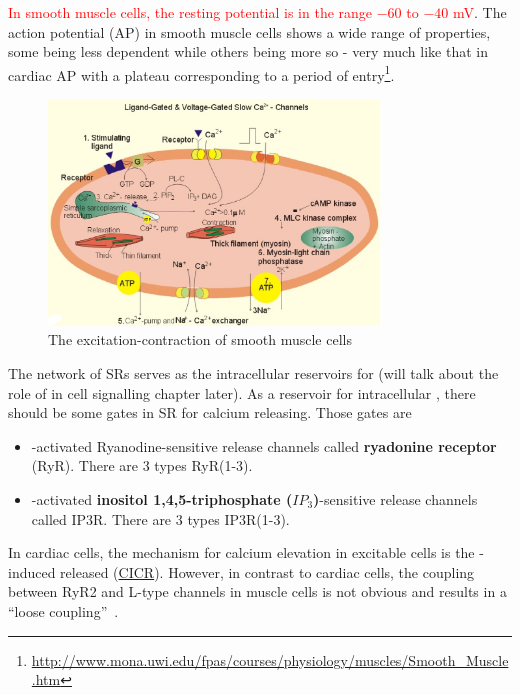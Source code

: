 \textcolor{red}{In smooth muscle cells, the resting potential is in
  the range $-60$ to $-40$ mV}.
The action potential (AP) in smooth muscle cells shows a wide range of
properties, some being less  dependent while others being
more so - very much like that in cardiac AP with a plateau
corresponding to a period of 
entry\footnote{\url{http://www.mona.uwi.edu/fpas/courses/physiology/muscles/Smooth_Muscle.htm}}.


\begin{figure}[hbt]
  \centerline{\includegraphics[height=6cm,
    angle=0]{./images/smooth_muscle_components.eps}}
\caption{The excitation-contraction of smooth muscle cells}
\label{fig:smooth_muscle_structure}
\end{figure}


The network of SRs serves as the intracellular reservoirs for
 (will talk about the role of  in cell signalling
chapter later). As a reservoir for intracellular , there
should be some gates in SR for calcium releasing. Those gates are
\begin{itemize}
\item {}-activated Ryanodine-sensitive  release
  channels called {\bf ryadonine receptor} ({RyR}). There are 3 types
  RyR(1-3).

\item {}-activated
  {\bf inositol 1,4,5-triphosphate ($IP_3$)}-sensitive 
  release channels called IP3R. There are 3 types IP3R(1-3). 
\end{itemize}
In cardiac cells, the mechanism for calcium elevation in excitable
cells is the -induced  released
(\hyperref[sec:cicr]{CICR}). However, in contrast to cardiac cells,
the coupling between RyR2 and L-type  channels in muscle
cells is not obvious and results in a ``loose
coupling''~\cite{amberg2006cicr}.


